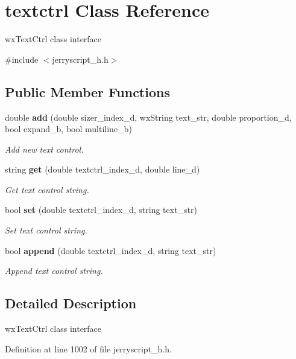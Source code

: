 \section{textctrl Class Reference}
\label{classtextctrl}


wx\+Text\+Ctrl class interface  




{\ttfamily \#include $<$jerryscript\+\_\+h.\+h$>$}

\subsection*{Public Member Functions}
\begin{DoxyCompactItemize}
\item 
double \textbf{ add} (double sizer\+\_\+index\+\_\+d, wx\+String text\+\_\+str, double proportion\+\_\+d, bool expand\+\_\+b, bool multiline\+\_\+b)
\begin{DoxyCompactList}\small\item\em Add new text control. \end{DoxyCompactList}\item 
string \textbf{ get} (double textctrl\+\_\+index\+\_\+d, double line\+\_\+d)
\begin{DoxyCompactList}\small\item\em Get text control string. \end{DoxyCompactList}\item 
bool \textbf{ set} (double textctrl\+\_\+index\+\_\+d, string text\+\_\+str)
\begin{DoxyCompactList}\small\item\em Set text control string. \end{DoxyCompactList}\item 
bool \textbf{ append} (double textctrl\+\_\+index\+\_\+d, string text\+\_\+str)
\begin{DoxyCompactList}\small\item\em Append text control string. \end{DoxyCompactList}\end{DoxyCompactItemize}


\subsection{Detailed Description}
wx\+Text\+Ctrl class interface 

Definition at line 1002 of file jerryscript\+\_\+h.\+h.



